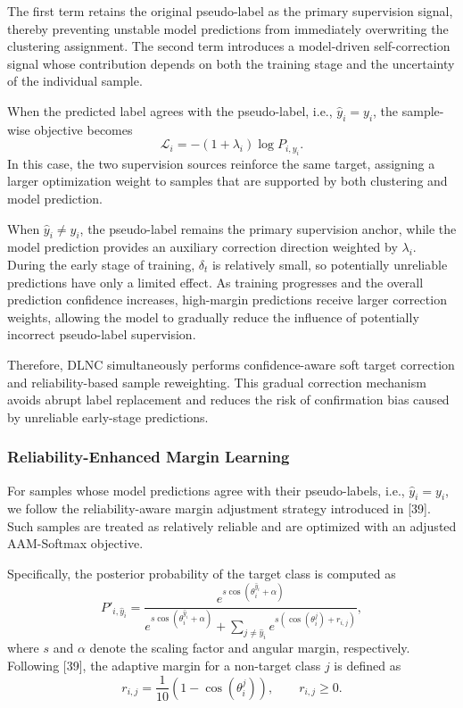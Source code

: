 \documentclass[lettersize,journal]{IEEEtran}
\begin{document}
The first term retains the original pseudo-label as the primary
supervision signal, thereby preventing unstable model
predictions from immediately overwriting the clustering
assignment. The second term introduces a model-driven
self-correction signal whose contribution depends on both the
training stage and the uncertainty of the individual sample.

When the predicted label agrees with the pseudo-label,
i.e., $\hat{y}_i=y_i$, the sample-wise objective becomes
\begin{equation}
\mathcal{L}_i
=
-(1+\lambda_i)\log P_{i,y_i}.
\end{equation}
In this case, the two supervision sources reinforce the same
target, assigning a larger optimization weight to samples that
are supported by both clustering and model prediction.

When $\hat{y}_i\neq y_i$, the pseudo-label remains the primary
supervision anchor, while the model prediction provides an
auxiliary correction direction weighted by $\lambda_i$. During
the early stage of training, $\delta_t$ is relatively small, so
potentially unreliable predictions have only a limited effect.
As training progresses and the overall prediction confidence
increases, high-margin predictions receive larger correction
weights, allowing the model to gradually reduce the influence
of potentially incorrect pseudo-label supervision.

Therefore, DLNC simultaneously performs confidence-aware
soft target correction and reliability-based sample reweighting.
This gradual correction mechanism avoids abrupt label
replacement and reduces the risk of confirmation bias caused by
unreliable early-stage predictions.

\subsubsection{Reliability-Enhanced Margin Learning}

For samples whose model predictions agree with their pseudo-labels,
i.e., $\hat{y}_i=y_i$, we follow the reliability-aware margin
adjustment strategy introduced in [39]. Such samples are treated as
relatively reliable and are optimized with an adjusted AAM-Softmax
objective.

Specifically, the posterior probability of the target class is
computed as
\begin{equation}
P'_{i,\hat y_i}
=
\frac{
e^{s\cos(\theta_i^{\hat y_i}+\alpha)}
}
{
e^{s\cos(\theta_i^{\hat y_i}+\alpha)}
+
\sum_{j\neq \hat y_i}
e^{s(\cos(\theta_i^j)+r_{i,j})}
},
\end{equation}
where $s$ and $\alpha$ denote the scaling factor and angular margin,
respectively. Following [39], the adaptive margin for a non-target
class $j$ is defined as
\begin{equation}
r_{i,j}
=
\frac{1}{10}
\left(
1-\cos(\theta_i^j)
\right),
\qquad r_{i,j}\geq 0.
\end{equation}
\end{document}
